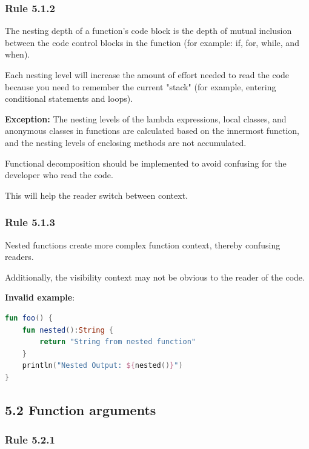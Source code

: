 {{{{\subsubsection*{\textbf{Rule 5.1.2}}
\leavevmode\newline



The nesting depth of a function's code block is the depth of mutual inclusion between the code control blocks in the function (for example: if, for, while, and when).

Each nesting level will increase the amount of effort needed to read the code because you need to remember the current "stack" (for example, entering conditional statements and loops). 

\textbf{Exception:} The nesting levels of the lambda expressions, local classes, and anonymous classes in functions are calculated based on the innermost function, and the nesting levels of enclosing methods are not accumulated.

Functional decomposition should be implemented to avoid confusing for the developer who read the code.

This will help the reader switch between context.



\subsubsection*{\textbf{Rule 5.1.3}}
\leavevmode\newline

Nested functions create more complex function context, thereby confusing readers.

Additionally, the visibility context may not be obvious to the reader of the code.



\textbf{Invalid example}:

\begin{lstlisting}[language=Kotlin]
fun foo() { 
    fun nested():String { 
        return "String from nested function" 
    } 
    println("Nested Output: ${nested()}") 
} 
\end{lstlisting}


\subsection*{\textbf{5.2 Function arguments}}

\subsubsection*{\textbf{Rule 5.2.1}}
\leavevmode\newline



}}}}
